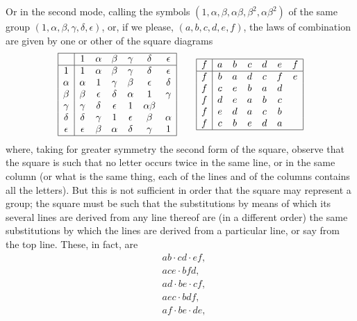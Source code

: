 \documentclass[11pt,a4paper]{article}
\begin{document}
Or in the second mode, calling the symbols $(1, \alpha, \beta, \alpha\beta, \beta^{2}, \alpha\beta^{2})$ of the same group $(1, \alpha, \beta, \gamma, \delta, \epsilon)$, or, if we please, $(a, b, c, d, e, f)$, the laws of combination are given by one or other of the square diagrams
\[
\begin{array}{|c|cccccc|}
\hline
& 1 & \alpha & \beta & \gamma & \delta & \epsilon \\
\hline
1 & 1 & \alpha & \beta & \gamma & \delta & \epsilon \\
\alpha & \alpha & 1 & \gamma & \beta & \epsilon & \delta \\
\beta & \beta & \epsilon & \delta & \alpha & 1 & \gamma \\
\gamma & \gamma & \delta & \epsilon & 1 & \alpha\beta & \\
\delta & \delta & \gamma & 1 & \epsilon & \beta & \alpha \\
\epsilon & \epsilon & \beta & \alpha & \delta & \gamma & 1 \\
\hline
\end{array}
\qquad
\begin{array}{|c|cccccc|}
\hline
f & a & b & c & d & e & f \\
\hline
f & b & a & d & c & f & e \\
f & c & e & b & a & d & \\
f & d & e & a & b & c & \\
f & e & d & a & c & b & \\
f & c & b & e & d & a & \\
\hline
\end{array}
\]
where, taking for greater symmetry the second form of the square, observe that the square is such that no letter occurs twice in the same line, or in the same column (or what is the same thing, each of the lines and of the columns contains all the letters). But this is not sufficient in order that the square may represent a group; the square must be such that the substitutions by means of which its several lines are derived from any line thereof are (in a different order) the same substitutions by which the lines are derived from a particular line, or say from the top line. These, in fact, are
\begin{align*}
& ab\cdot cd\cdot ef,\\
& ace\cdot bfd,\\
& ad\cdot be\cdot cf,\\
& aec\cdot bdf,\\
& af\cdot be\cdot de,
\end{align*}
\end{document}

